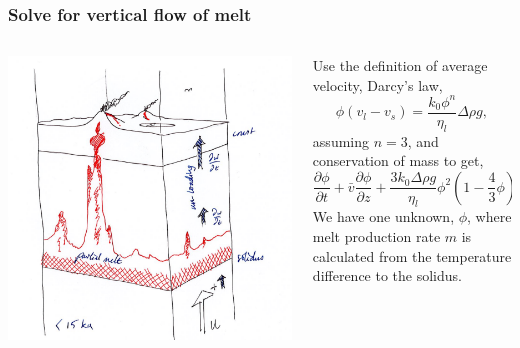 \documentclass[aspectratio=169]{beamer}
\begin{document}
\begin{frame}
    \frametitle{Solve for vertical flow of melt}
    \begin{columns}
        \begin{column}{0.5\textwidth}
            \includegraphics[width=.45\paperwidth]{./figures/sketch1b.png}
        \end{column}
        \begin{column}{0.5\textwidth}
            Use the definition of average velocity, Darcy's law,\newline
            \[
            \phi\left(v_{l}-v_{s}\right) = \frac{k_{0}\phi^{n}}{\eta_{l}}\Delta\rho g,
            \]
            assuming $n=3$, and conservation of mass to get,\newline
            \[
            \frac{\partial\phi}{\partial t} + \bar{v}\frac{\partial\phi}{\partial z} + \frac{3k_{0}\Delta\rho g}{\eta_{l}}\phi^{2}\left(1 - \frac{4}{3}\phi\right)\frac{\partial\phi}{\partial z} = m.
            \]
            We have one unknown, $\phi$, where melt production rate $m$ is calculated from the temperature difference to the solidus.
        \end{column}
    \end{columns}
\end{frame}
\end{document}
